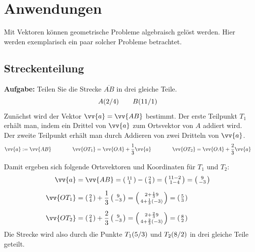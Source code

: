 \newpage
\section{Anwendungen}

Mit Vektoren können geometrische Probleme algebraisch gelöst werden. Hier werden
exemplarisch ein paar solcher Probleme betrachtet.

\subsection{Streckenteilung}
\textbf{Aufgabe:} Teilen Sie die Strecke $\overline{AB}$ in drei gleiche Teile.
\[
  \coord[A]{2,4} \qquad \coord[B]{11,1}
\]
Zunächst wird der Vektor $\vv{a} = \vv{AB}$ bestimmt. Der erste Teilpunkt
$T_{1}$ erhält man, indem ein Drittel von $\vv{a}$ zum Ortsvektor von $A$
addiert wird. Der zweite Teilpunkt erhält man durch Addieren von zwei Dritteln
von $\vv{a}$.
\[
  \vv{a} := \vv{AB} \qquad\qquad \vv{OT_{1}} = \vv{OA} + \frac{1}{3}\vv{a} \qquad\qquad \vv{OT_{2}} = \vv{OA} + \frac{2}{3}\vv{a}
\]
\begin{center}
\end{center}
Damit ergeben sich folgende Ortsvektoren und Koordinaten für $T_{1}$ und $T_{2}$:
\begin{align*}
       \vv{a} &= \vv{AB} = \tvec{11,1} - \tvec{2,4} = \tvec{11-2,1-4} = \tvec{9,-3} \\[2mm]
  \vv{OT_{1}} &= \tvec{2,4}+\frac{1}{3}\tvec{9,-3} = \tvec{2+\frac{1}{3}9,4+\frac{1}{3}(-3)} = \tvec{5,3} \\[2mm]
  \vv{OT_{2}} &= \tvec{2,4}+\frac{2}{3}\tvec{9,-3} = \tvec{2+\frac{2}{3}9,4+\frac{2}{3}(-3)} = \tvec{8,2}
\end{align*}
Die Strecke wird also durch die Punkte $\coord[T_{1}]{5,3}$ und
$\coord[T_{2}]{8,2}$ in drei gleiche Teile geteilt.


